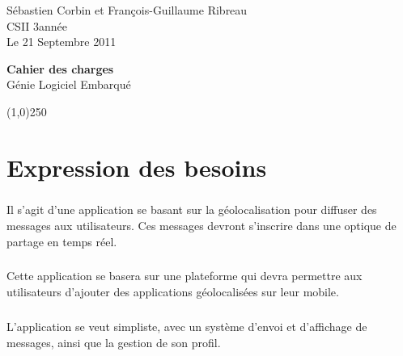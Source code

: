 \documentclass[a4paper,12pt]{report}
\begin{document}
  \begin{onehalfspace}

    \begin{titlepage}
      \begin{center}
        Sébastien Corbin et François-Guillaume Ribreau\\
        CSII 3\ieme année\\
    		Le 21 Septembre 2011\\
      \end{center}
      \hrulefill
      \vspace{7cm}
      \begin{center}
        \LARGE \textbf{Cahier des charges}\\
        \vspace{3cm}
        \normalsize Génie Logiciel Embarqué
      \end{center}

      \vspace{9,5cm}

      \begin{center}
      \line(1,0){250}
      \end{center}

      \begin{center}
      \tiny{\currfilename}
      \end{center}

    \end{titlepage}
    \clearpage

	\chapter{Expression des besoins}
	
	\paragraph*{}
	Il s'agit d'une application se basant sur la géolocalisation pour diffuser des messages aux utilisateurs. Ces messages devront s'inscrire dans une optique de partage en temps réel.
	
	\paragraph*{}
	Cette application se basera sur une plateforme qui devra permettre aux utilisateurs d'ajouter des applications géolocalisées sur leur mobile.		

	\paragraph*{}
	L'application se veut simpliste, avec un système d'envoi et d'affichage de messages, ainsi que la gestion de son profil.
	

\end{onehalfspace}
\end{document}
